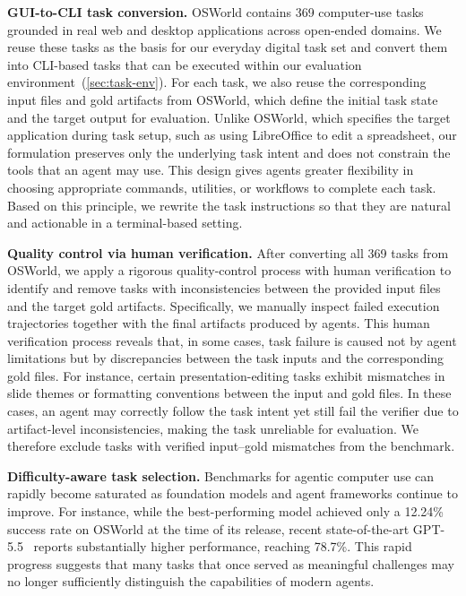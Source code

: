 \documentclass{llmxive}
\begin{document}
\noindent\textbf{GUI-to-CLI task conversion.}
OSWorld contains 369 computer-use tasks grounded in real web and desktop applications across open-ended domains. We reuse these tasks as the basis for our everyday digital task set and convert them into CLI-based tasks that can be executed within our evaluation environment~(\cref{sec:task-env}). For each task, we also reuse the corresponding input files and gold artifacts from OSWorld, which define the initial task state and the target output for evaluation. Unlike OSWorld, which specifies the target application during task setup, such as using LibreOffice to edit a spreadsheet, our formulation preserves only the underlying task intent and does not constrain the tools that an agent may use. This design gives agents greater flexibility in choosing appropriate commands, utilities, or workflows to complete each task. Based on this principle, we rewrite the task instructions so that they are natural and actionable in a terminal-based setting.

\noindent\textbf{Quality control via human verification.}
After converting all 369 tasks from OSWorld, we apply a rigorous quality-control process with human verification to identify and remove tasks with inconsistencies between the provided input files and the target gold artifacts.
% 
Specifically, we manually inspect failed execution trajectories together with the final artifacts produced by agents. This human verification process reveals that, in some cases, task failure is caused not by agent limitations but by discrepancies between the task inputs and the corresponding gold files. For instance, certain presentation-editing tasks exhibit mismatches in slide themes or formatting conventions between the input and gold files. In these cases, an agent may correctly follow the task intent yet still fail the verifier due to artifact-level inconsistencies, making the task unreliable for evaluation. We therefore exclude tasks with verified input--gold mismatches from the benchmark.


\noindent\textbf{Difficulty-aware task selection.}
Benchmarks for agentic computer use can rapidly become saturated as foundation models and agent frameworks continue to improve. For instance, while the best-performing model achieved only a 12.24\% success rate on OSWorld at the time of its release, recent state-of-the-art GPT-5.5~\citep{openai2026introducinggpt55} reports substantially higher performance, reaching 78.7\%. This rapid progress suggests that many tasks that once served as meaningful challenges may no longer sufficiently distinguish the capabilities of modern agents. 
\end{document}
